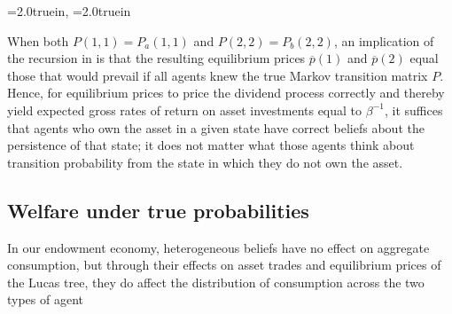 \centerline{\epsfxsize=2.0truein, \epsfxsize=2.0truein}
\caption{True expected net rates of return on
asset investments by agents of type $a$ in the
left panel and type $b$ in the right panel. The 
returns are functions of the persistence of the 
state in which investments are made, i.e.,
the true probabilities $P(1,1)$ and $P(2,2)$, 
respectively.}
\endfigure
\medskip


When both $P(1,1)=P_a(1,1)$ and $P(2,2)=P_b(2,2)$,
an implication of the recursion in 
 is that the resulting equilibrium
prices $\overline p(1)$ and $\overline p(2)$ equal those
 that would prevail if all agents knew the
true Markov transition matrix $P$. Hence, for
equilibrium prices   to price  the 
dividend process correctly and thereby yield expected gross 
rates of return on asset investments equal to 
$\beta^{-1}$, it suffices that  agents who own the asset in a given state  have 
correct beliefs about the persistence of that state; 
it does not matter what those agents think 
about  transition probability from the  
state in which they do not own the asset.


\subsection{Welfare under  true probabilities}
In our endowment economy, heterogeneous beliefs have no effect on aggregate 
consumption, but through their effects on asset trades and  equilibrium prices of  the 
Lucas tree, they do affect the 
distribution of consumption across the two types of agent 

